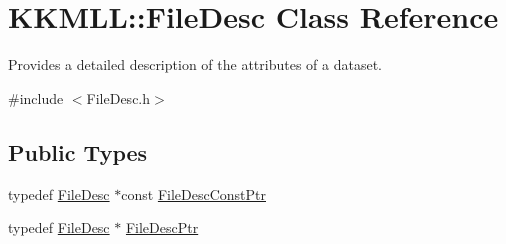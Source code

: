\hypertarget{class_k_k_m_l_l_1_1_file_desc}{}\section{K\+K\+M\+LL\+:\+:File\+Desc Class Reference}
\label{class_k_k_m_l_l_1_1_file_desc}


Provides a detailed description of the attributes of a dataset.  




{\ttfamily \#include $<$File\+Desc.\+h$>$}

\subsection*{Public Types}
\begin{DoxyCompactItemize}
\item 
typedef \hyperlink{class_k_k_m_l_l_1_1_file_desc}{File\+Desc} $\ast$const \hyperlink{class_k_k_m_l_l_1_1_file_desc_a4e1a7521c151f58c438413a5be02ae2a}{File\+Desc\+Const\+Ptr}
\item 
typedef \hyperlink{class_k_k_m_l_l_1_1_file_desc}{File\+Desc} $\ast$ \hyperlink{class_k_k_m_l_l_1_1_file_desc_a58f5730f6f51a4844a729377ada1971b}{File\+Desc\+Ptr}
\end{DoxyCompactItemize}
